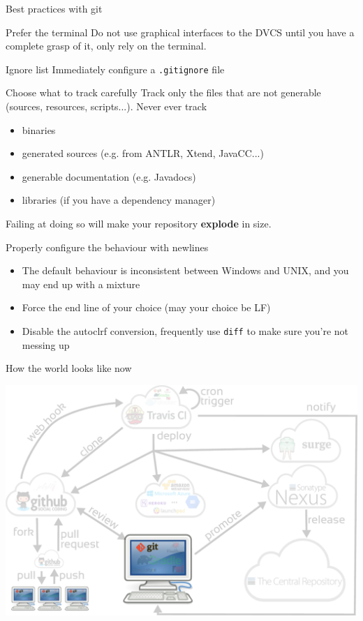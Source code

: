 \documentclass[presentation]{beamer}
\begin{document}
\begin{frame}{Best practices with git}
	\begin{block}{Prefer the terminal}
		Do not use graphical interfaces to the DVCS until you have a complete grasp of it, only rely on the terminal.
	\end{block}
	\begin{block}{Ignore list}
		Immediately configure a \texttt{.gitignore} file
	\end{block}
	\begin{block}{Choose what to track carefully}
		Track only the files that are not generable (sources, resources, scripts...). Never ever track
		\begin{itemize}
			\item binaries
			\item generated sources (e.g. from ANTLR, Xtend, JavaCC...)
			\item generable documentation (e.g. Javadocs)
			\item libraries (if you have a dependency manager)
		\end{itemize}
		Failing at doing so will make your repository \textbf{explode} in size.
	\end{block}
	\begin{block}{Properly configure the behaviour with newlines}
		\begin{itemize}
			\item The default behaviour is inconsistent between Windows and UNIX, and you may end up with a mixture
			\item Force the end line of your choice (may your choice be LF)
			\item Disable the autoclrf conversion, frequently use \texttt{diff} to make sure you're not messing up
		\end{itemize}
	\end{block}
\end{frame}

\begin{frame}[fragile]{How the world looks like now}
	\begin{center}
		\includegraphics[width=.9\textwidth]{images/ci-git}
	\end{center}
\end{frame}
\end{document}
